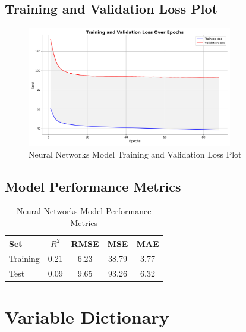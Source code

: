 \subsection{Training and Validation Loss Plot}

\begin{figure}[H]
    \centering
    \includegraphics[width=0.8\textwidth]{figures/nn_training_loss.png}
    \caption{Neural Networks Model Training and Validation Loss Plot}
    \label{fig:neural_networks_loss_plot}
\end{figure}


\subsection{Model Performance Metrics}

\begin{table}[H]
    \centering
    \caption{Neural Networks Model Performance Metrics}
    \label{tab:neural_networks_performance}
    \begin{tabular}{lcccc}
    \hline
    Set & $R^2$ & RMSE & MSE & MAE \\ 
    \hline
    Training & 0.21 & 6.23 & 38.79 & 3.77 \\
    Test & 0.09 & 9.65 & 93.26 & 6.32 \\
    \hline
    \end{tabular}

\end{table}

\section{Variable Dictionary}
\label{sec:variable-dictionary}

